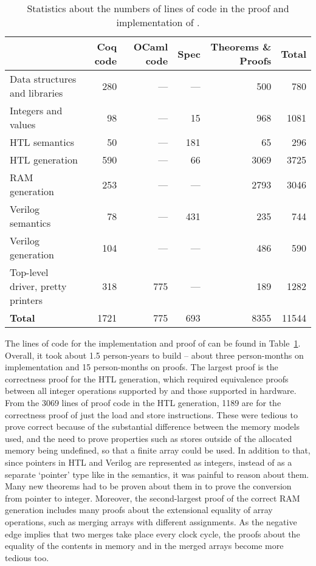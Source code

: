 \begin{table}
  \centering
  \caption{Statistics about the numbers of lines of code in the proof and implementation of \vericert{}.}\label{tab:proof_statistics}
  \begin{tabular}{lrrrrr}
    \toprule
    & \textbf{Coq code} & \multicolumn{1}{p{1cm}}{\raggedleft\textbf{OCaml code}} & \textbf{Spec} & \multicolumn{1}{p{2cm}}{\raggedleft\textbf{Theorems \& Proofs}} & \textbf{Total}\\
    \midrule
    {Data structures and libraries}     & 280  & --- & ---  & 500  & 780   \\
    {Integers and values}               & 98   & --- & 15   & 968  & 1081  \\
    {HTL semantics}                     & 50   & --- & 181  & 65   & 296   \\
    {HTL generation}                    & 590  & --- & 66   & 3069 & 3725  \\
    {RAM generation}                    & 253  & --- & ---  & 2793 & 3046  \\
    {Verilog semantics}                 & 78   & --- & 431  & 235  & 744   \\
    {Verilog generation}                & 104  & --- & ---  & 486  & 590   \\
    {Top-level driver, pretty printers} & 318  & 775 & ---  & 189  & 1282  \\
    \midrule
    \textbf{Total}                      & 1721 & 775 & 693  & 8355 & 11544 \\
    \bottomrule
  \end{tabular}
\end{table}

The lines of code for the implementation and proof of \vericert{} can be found in Table~\ref{tab:proof_statistics}.  Overall, it took about 1.5 person-years to build \vericert{} -- about three person-months on implementation and 15 person-months on proofs.  The largest proof is the correctness proof for the HTL generation, which required equivalence proofs between all integer operations supported by \compcert{} and those supported in hardware.  From the 3069 lines of proof code in the HTL generation, 1189 are for the correctness proof of just the load and store instructions.  These were tedious to prove correct because of the substantial difference between the memory models used, and the need to prove properties such as stores outside of the allocated memory being undefined, so that a finite array could be used. In addition to that, since pointers in HTL and Verilog are represented as integers, instead of as a separate `pointer' type like in the \compcert{} semantics, it was painful to reason about them.  Many new theorems had to be proven about them in \vericert{} to prove the conversion from pointer to integer.  Moreover, the second-largest proof of the correct RAM generation includes many proofs about the extensional equality of array operations, such as merging arrays with different assignments.  As the negative edge implies that two merges take place every clock cycle, the proofs about the equality of the contents in memory and in the merged arrays become more tedious too.

